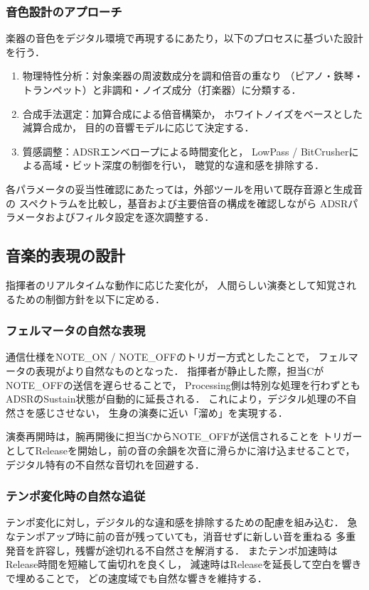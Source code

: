 \documentclass[lualatex,book,paper=a4paper,jafontsize=11.5pt,jafontscale=1.05,oneside]{jlreq}
\begin{document}
\subsubsection*{音色設計のアプローチ}
楽器の音色をデジタル環境で再現するにあたり，以下のプロセスに基づいた設計を行う．

\begin{enumerate}
  \item 物理特性分析：対象楽器の周波数成分を調和倍音の重なり
  （ピアノ・鉄琴・トランペット）と非調和・ノイズ成分（打楽器）に分類する．

  \item 合成手法選定：加算合成による倍音構築か，
  ホワイトノイズをベースとした減算合成か，
  目的の音響モデルに応じて決定する．

  \item 質感調整：ADSRエンベロープによる時間変化と，
  LowPass / BitCrusherによる高域・ビット深度の制御を行い，
  聴覚的な違和感を排除する．
\end{enumerate}

各パラメータの妥当性確認にあたっては，外部ツールを用いて既存音源と生成音の
スペクトラムを比較し，基音および主要倍音の構成を確認しながら
ADSRパラメータおよびフィルタ設定を逐次調整する．


\subsection{音楽的表現の設計}

指揮者のリアルタイムな動作に応じた変化が，
人間らしい演奏として知覚されるための制御方針を以下に定める．

\subsubsection*{フェルマータの自然な表現}
通信仕様をNOTE\_ON / NOTE\_OFFのトリガー方式としたことで，
フェルマータの表現がより自然なものとなった．
指揮者が静止した際，担当CがNOTE\_OFFの送信を遅らせることで，
Processing側は特別な処理を行わずともADSRのSustain状態が自動的に延長される．
これにより，デジタル処理の不自然さを感じさせない，
生身の演奏に近い「溜め」を実現する．

演奏再開時は，腕再開後に担当CからNOTE\_OFFが送信されることを
トリガーとしてReleaseを開始し，前の音の余韻を次音に滑らかに溶け込ませることで，
デジタル特有の不自然な音切れを回避する．

\subsubsection*{テンポ変化時の自然な追従}
テンポ変化に対し，デジタル的な違和感を排除するための配慮を組み込む．
急なテンポアップ時に前の音が残っていても，消音せずに新しい音を重ねる
多重発音を許容し，残響が途切れる不自然さを解消する．
またテンポ加速時はRelease時間を短縮して歯切れを良くし，
減速時はReleaseを延長して空白を響きで埋めることで，
どの速度域でも自然な響きを維持する．
\end{document}
